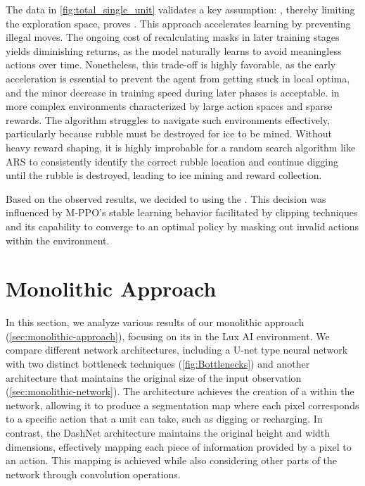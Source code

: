 \noindent The data in \textcolor{deepblue}{\autoref{fig:total_single_unit}} validates a key assumption: , thereby limiting the exploration space, proves . This approach accelerates learning by preventing illegal moves. The ongoing cost of recalculating masks in later training stages yields diminishing returns, as the model naturally learns to avoid meaningless actions over time. Nonetheless, this trade-off is highly favorable, as the early acceleration is essential to prevent the agent from getting stuck in local optima, and the minor decrease in training speed during later phases is acceptable.  in more complex environments characterized by large action spaces and sparse rewards. The algorithm struggles to navigate such environments effectively, particularly because rubble must be destroyed for ice to be mined. Without heavy reward shaping, it is highly improbable for a random search algorithm like ARS to consistently identify the correct rubble location and continue digging until the rubble is destroyed, leading to ice mining and reward collection.

\bigskip

\noindent Based on the observed results, we decided to  using the . This decision was influenced by M-PPO's stable learning behavior facilitated by clipping techniques and its capability to converge to an optimal policy by masking out invalid actions within the environment.


\section{Monolithic Approach}
\label{sec:monolithic-approach-results}

\noindent In this section, we analyze various results of our monolithic approach (\autoref{sec:monolithic-approach}), focusing on its  in the Lux AI environment. We compare different network architectures, including a U-net type neural network with two distinct bottleneck techniques (\autoref{fig:Bottlenecks}) and another architecture that maintains the original size of the input observation (\autoref{sec:monolithic-network}). The  architecture achieves the creation of a  within the network, allowing it to produce a segmentation map where each pixel corresponds to a specific action that a unit can take, such as digging or recharging. In contrast, the DashNet architecture maintains the original height and width dimensions, effectively mapping each piece of information provided by a pixel to an action. This mapping is achieved while also considering other parts of the network through convolution operations.

